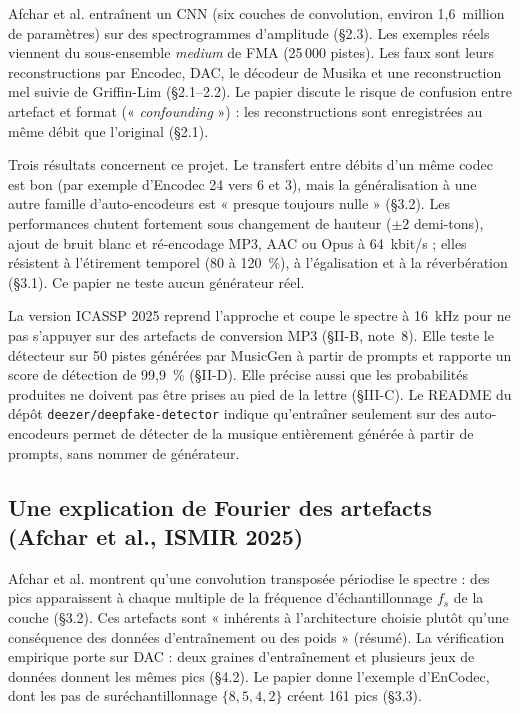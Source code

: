 \documentclass[a4paper, 11pt]{article}
\begin{document}
Afchar et al. \cite{afchar2024easy} entraînent un CNN (six couches de convolution, environ 1,6~million de
paramètres) sur des spectrogrammes d'amplitude (§2.3). Les exemples réels viennent du sous-ensemble
\emph{medium} de FMA (25\,000 pistes). Les faux sont leurs reconstructions par Encodec, DAC, le décodeur de
Musika et une reconstruction mel suivie de Griffin-Lim (§2.1--2.2). Le papier discute le risque de
confusion entre artefact et format (« \emph{confounding} ») : les reconstructions sont enregistrées au même
débit que l'original (§2.1).

Trois résultats concernent ce projet. Le transfert entre débits d'un même codec est bon (par exemple d'Encodec
24 vers 6 et 3), mais la généralisation à une autre famille d'auto-encodeurs est « presque toujours nulle »
(§3.2). Les performances chutent fortement sous changement de hauteur ($\pm 2$ demi-tons), ajout de bruit blanc
et ré-encodage MP3, AAC ou Opus à 64~kbit/s ; elles résistent à l'étirement temporel (80 à 120~\%), à
l'égalisation et à la réverbération (§3.1). Ce papier ne teste aucun générateur réel.

La version ICASSP 2025 \cite{afchar2025challenges} reprend l'approche et coupe le spectre à 16~kHz pour ne pas
s'appuyer sur des artefacts de conversion MP3 (§II-B, note~8). Elle teste le détecteur sur 50 pistes générées
par MusicGen à partir de prompts et rapporte un score de détection de 99,9~\% (§II-D). Elle précise aussi que
les probabilités produites ne doivent pas être prises au pied de la lettre (§III-C). Le README du dépôt
\texttt{deezer/deepfake-detector} indique qu'entraîner seulement sur des auto-encodeurs permet de détecter de la
musique entièrement générée à partir de prompts, sans nommer de générateur.

\subsection{Une explication de Fourier des artefacts (Afchar et al., ISMIR 2025)}
\label{sec:fourier}

Afchar et al. \cite{afchar2025fourier} montrent qu'une convolution transposée périodise le spectre : des pics
apparaissent à chaque multiple de la fréquence d'échantillonnage $f_s$ de la couche (§3.2). Ces artefacts sont
« inhérents à l'architecture choisie plutôt qu'une conséquence des données d'entraînement ou des poids »
(résumé). La vérification empirique porte sur DAC : deux graines d'entraînement et plusieurs jeux de données
donnent les mêmes pics (§4.2). Le papier donne l'exemple d'EnCodec, dont les pas de suréchantillonnage
$\{8, 5, 4, 2\}$ créent 161 pics (§3.3).
\end{document}
